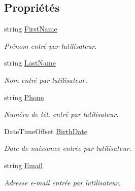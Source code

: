 \subsection*{Propriétés}
\begin{DoxyCompactItemize}
\item 
string \hyperlink{class_boxes_1_1_view_models_1_1_register_view_model_ade9e9b19aa0dd12d6a2a602b31589028}{First\+Name}
\begin{DoxyCompactList}\small\item\em Prénom entré par l\textquotesingle{}utilisateur. \end{DoxyCompactList}\item 
string \hyperlink{class_boxes_1_1_view_models_1_1_register_view_model_aa472c0e4d5e0b86954a8a9f8b6293c5f}{Last\+Name}
\begin{DoxyCompactList}\small\item\em Nom entré par l\textquotesingle{}utilisateur. \end{DoxyCompactList}\item 
string \hyperlink{class_boxes_1_1_view_models_1_1_register_view_model_ad1f7bd5d2949698e68fae56f4b87980e}{Phone}
\begin{DoxyCompactList}\small\item\em Numéro de tél. entré par l\textquotesingle{}utilisateur. \end{DoxyCompactList}\item 
Date\+Time\+Offset \hyperlink{class_boxes_1_1_view_models_1_1_register_view_model_a6c9e918e6c3b4b4865c8ccd5956867ac}{Birth\+Date}
\begin{DoxyCompactList}\small\item\em Date de naissance entrée par l\textquotesingle{}utilisateur. \end{DoxyCompactList}\item 
string \hyperlink{class_boxes_1_1_view_models_1_1_register_view_model_aaf670271c9923b35ba525b1d04785511}{Email}
\begin{DoxyCompactList}\small\item\em Adresse e-\/mail entrée par l\textquotesingle{}utilisateur. \end{DoxyCompactList}\item 

\end{DoxyCompactItemize}
